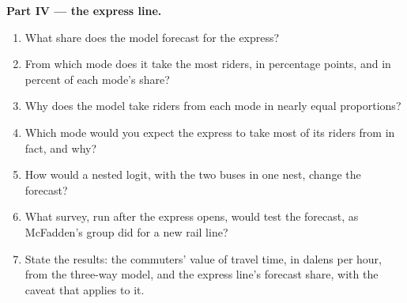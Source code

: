 \begin{problem}
\medskip\noindent\textbf{Part IV --- the express line.}
\begin{enumerate}[resume]
\item What share does the model forecast for the express?
\item From which mode does it take the most riders, in percentage points, and in
percent of each mode's share?
\item Why does the model take riders from each mode in nearly equal proportions?
\item Which mode would you expect the express to take most of its riders from in
fact, and why?
\item How would a nested logit, with the two buses in one nest, change the
forecast?
\item What survey, run after the express opens, would test the forecast, as
McFadden's group did for a new rail line?
\item State the results: the commuters' value of travel time, in dalens per hour,
from the three-way model, and the express line's forecast share, with the
caveat that applies to it.
\end{enumerate}
\end{problem}
